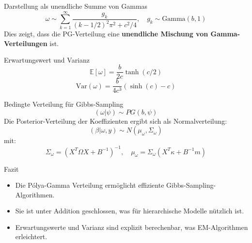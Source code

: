 \documentclass{beamer}
\begin{document}
\begin{frame}{Darstellung als unendliche Summe von Gammas}
	\begin{equation}
		\omega \sim \sum_{k=1}^{\infty} \frac{g_k}{(k - 1/2)^2 \pi^2 + c^2/4}, \quad g_k \sim \text{Gamma}(b, 1)
	\end{equation}
	Dies zeigt, dass die PG-Verteilung eine \textbf{unendliche Mischung von Gamma-Verteilungen} ist.
\end{frame}

\begin{frame}{Erwartungswert und Varianz}
	\begin{equation}
		\mathbb{E} [\omega] = \frac{b}{2c} \tanh(c/2)
	\end{equation}
	\begin{equation}
		\text{Var}(\omega) = \frac{b}{4c^3} (\sinh(c) - c)
	\end{equation}
\end{frame}

\begin{frame}{Bedingte Verteilung für Gibbs-Sampling}
	\begin{equation}
		(\omega | \psi) \sim PG(b, \psi)
	\end{equation}
	Die Posterior-Verteilung der Koeffizienten ergibt sich als Normalverteilung:
	\begin{equation}
		(\beta | \omega, y) \sim N(\mu_\omega, \Sigma_\omega)
	\end{equation}
	mit:
	\begin{equation}
		\Sigma_\omega = (X^T \Omega X + B^{-1})^{-1}, \quad \mu_\omega = \Sigma_\omega (X^T \kappa + B^{-1} m)
	\end{equation}
\end{frame}

\begin{frame}{Fazit}
	\begin{itemize}
		\item Die Pólya-Gamma Verteilung ermöglicht effiziente Gibbs-Sampling-Algorithmen.
		\item Sie ist unter Addition geschlossen, was für hierarchische Modelle nützlich ist.
		\item Erwartungswerte und Varianz sind explizit berechenbar, was EM-Algorithmen erleichtert.
	\end{itemize}
\end{frame}
\end{document}
